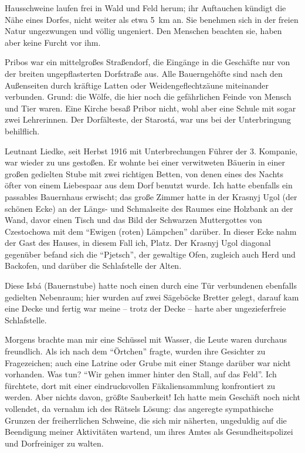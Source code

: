 \documentclass[a5paper,pagesize,10pt,twoside=true]{scrbook}
\begin{document}
Hausschweine laufen frei in Wald und Feld herum; ihr Auftauchen kündigt die Nähe eines Dorfes, nicht weiter als etwa 5~km an. Sie benehmen sich in der freien Natur ungezwungen und völlig ungeniert. Den Menschen beachten sie, haben aber keine Furcht vor ihm.

Pribos war ein mittelgroßes Straßendorf, die Eingänge in die Geschäfte nur von der breiten ungepflasterten Dorfstraße aus. Alle Bauerngehöfte sind nach den Außenseiten durch kräftige Latten oder Weidengeflechtzäune miteinander verbunden. Grund: die Wölfe, die hier noch die gefährlichen Feinde von Mensch und Tier waren. Eine Kirche besaß Pribor nicht, wohl aber eine Schule mit sogar zwei Lehrerinnen. Der Dorfälteste, der Starostá, war uns bei der Unterbringung behilflich.

Leutnant Liedke, seit Herbst 1916 mit Unterbrechungen Führer der 3. Kompanie, war wieder zu uns gestoßen. Er wohnte bei einer verwitweten Bäuerin in einer großen gedielten Stube mit zwei richtigen Betten, von denen eines des Nachts öfter von einem Liebespaar aus dem Dorf benutzt wurde. Ich hatte ebenfalls ein passables Bauernhaus erwischt; das große Zimmer hatte in der Krasnyj Ugol (der schönen Ecke) an der Längs- und Schmalseite des Raumes eine Holzbank an der Wand, davor einen Tisch und das Bild der Schwarzen Muttergottes von Czestochowa mit dem \enquote{Ewigen (roten) Lämpchen} darüber. In dieser Ecke nahm der Gast des Hauses, in diesem Fall ich, Platz. Der Krasnyj Ugol diagonal gegenüber befand sich die \enquote{Pjetsch}, der gewaltige Ofen, zugleich auch Herd und Backofen, und darüber die Schlafstelle der Alten.

Diese Isbá (Bauernstube) hatte noch einen durch eine Tür verbundenen ebenfalls gedielten Nebenraum; hier wurden auf zwei Sägeböcke Bretter gelegt, darauf kam eine Decke und fertig war meine -- trotz der Decke -- harte aber ungezieferfreie Schlafstelle.

Morgens brachte man mir eine Schüssel mit Wasser, die Leute waren durchaus freundlich. Als ich nach dem \enquote{Örtchen} fragte, wurden ihre Gesichter zu Fragezeichen; auch eine Latrine oder Grube mit einer Stange darüber war nicht vorhanden. Was tun? \enquote{Wir gehen immer hinter den Stall, auf das Feld}. Ich fürchtete, dort mit einer eindrucksvollen Fäkaliensammlung konfrontiert zu werden. Aber nichts davon, größte Sauberkeit! Ich hatte mein Geschäft noch nicht vollendet, da vernahm ich des Rätsels Lösung: das angeregte sympathische Grunzen der freiherrlichen Schweine, die sich mir näherten, ungeduldig auf die Beendigung meiner Aktivitäten wartend, um ihres Amtes als Gesundheitspolizei und Dorfreiniger zu walten.
\end{document}
